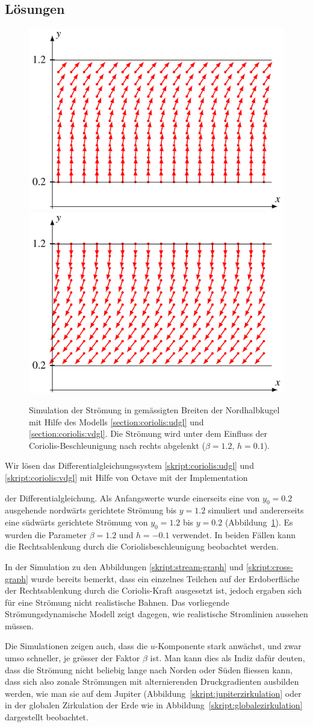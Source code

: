\subsection{Lösungen}
\begin{figure}
\centering
\includegraphics[width=0.48\hsize]{chapters/2/upright.pdf}
\hspace{0.02\hsize}
\includegraphics[width=0.48\hsize]{chapters/2/downright.pdf}
\caption{Simulation der Strömung in gemässigten Breiten der Nordhalbkugel
mit Hilfe des Modells
\eqref{section:coriolis:udgl}
und
\eqref{section:coriolis:vdgl}.
Die Strömung wird unter dem Einfluss der Coriolis-Beschleunigung nach
rechts abgelenkt ($\beta=1.2$, $h=0.1$).
\label{section:coriolis:simbild}}
\end{figure}
Wir lösen das Differentialgleichungssystem \eqref{skript:coriolis:udgl}
und \eqref{skript:coriolis:vdgl} mit Hilfe von Octave mit der Implementation

der Differentialgleichung.
Als Anfangswerte wurde einerseits eine von $y_0=0.2$ ausgehende nordwärts
gerichtete Strömung bis $y=1.2$ simuliert und andererseits eine südwärts
gerichtete Strömung von $y_0=1.2$ bis $y=0.2$
(Abbildung~\ref{section:coriolis:simbild}).
Es wurden die Parameter $\beta=1.2$ und $h=-0.1$ verwendet.
In beiden Fällen kann die Rechtsablenkung durch die Coriolisbeschleunigung
beobachtet werden.

In der Simulation zu den Abbildungen
\ref{skript:stream-graph}
und
\ref{skript:cross-graph}
wurde bereits bemerkt, dass ein einzelnes Teilchen auf der Erdoberfläche
der Rechtsablenkung durch die Coriolis-Kraft ausgesetzt ist,
jedoch ergaben sich für eine Strömung nicht realistische Bahnen.
Das vorliegende Strömungsdynamische Modell zeigt dagegen, wie
realistische Stromlinien aussehen müssen.

Die Simulationen zeigen auch, dass die $u$-Komponente stark anwächst,
und zwar umso schneller, je grösser der Faktor $\beta$ ist.
Man kann dies als Indiz dafür deuten, dass die Strömung nicht beliebig
lange nach Norden oder Süden fliessen kann, dass sich also zonale
Strömungen mit alternierenden Druckgradienten ausbilden werden, wie man
sie auf dem Jupiter (Abbildung~\ref{skript:jupiterzirkulation} oder
in der globalen Zirkulation der Erde wie in
Abbildung~\ref{skript:globalezirkulation} dargestellt beobachtet.


